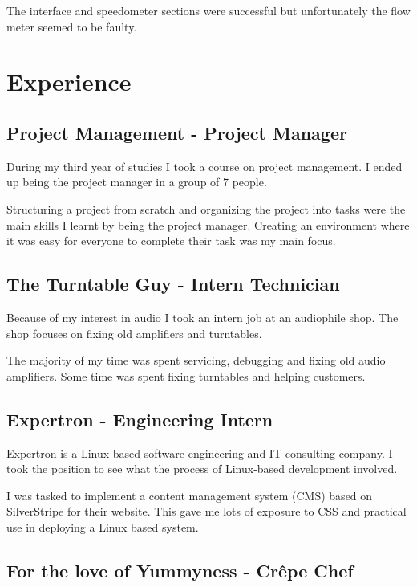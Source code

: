 \documentclass[twocolumn, 8pt]{extarticle}
\begin{document}
The interface and speedometer sections were successful
but unfortunately the flow meter seemed to be faulty.

\newpage
\section{Experience}

\subsection{Project Management - Project Manager}

During my third year of studies I took a course on project
management. I ended up being the project manager in a
group of 7 people.

Structuring a project from scratch and organizing the project
into tasks were the main skills I learnt by being the project
manager. Creating an environment where it was easy for
everyone to complete their task was my main focus.

\subsection{The Turntable Guy - Intern Technician}

Because of my interest in audio I took an intern job at an
audiophile shop. The shop focuses on fixing old amplifiers
and turntables.

The majority of my time was spent servicing, debugging and
fixing old audio amplifiers. Some time was spent fixing
turntables and helping customers.

\subsection{Expertron - Engineering Intern}

Expertron is a Linux-based software engineering and IT
consulting company. I took the position to see what the
process of Linux-based development involved.

I was tasked to implement a content management system
(CMS) based on SilverStripe for their website. This gave me
lots of exposure to CSS and practical use in deploying a
Linux based system.

\subsection{For the love of Yummyness - Crêpe Chef}
\end{document}
